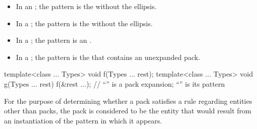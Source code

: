 \begin{itemize}
\item In an ; the pattern is
the  without the ellipsis.

\item In a ; the pattern is
the  without the ellipsis.

\item In a ; the pattern is an
.

\item In a ;
the pattern is the 
that contains an unexpanded pack.
\end{itemize}

\begin{example}
\begin{codeblock}
template<class ... Types> void f(Types ... rest);
template<class ... Types> void g(Types ... rest) {
  f(&rest ...);     // ``'' is a pack expansion; ``'' is its pattern
}
\end{codeblock}
\end{example}

\pnum
For the purpose of determining whether a pack satisfies a rule
regarding entities other than packs, the pack is
considered to be the entity that would result from an instantiation of
the pattern in which it appears.

